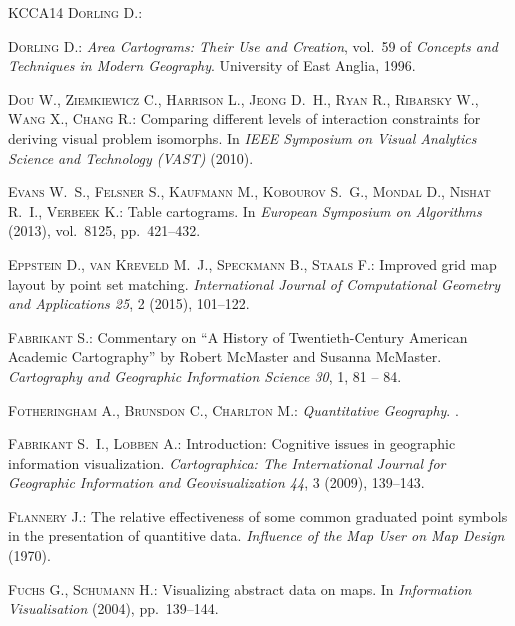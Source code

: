 \documentclass{egpubl}
\begin{document}
\begin{thebibliography}{\uppercase{KCCA{\etalchar{*}}14}}
\textsc{Dorling D.}:

\textsc{Dorling D.}:
\newblock \emph{{Area Cartograms: Their Use and Creation}}, vol.~59 of
  \emph{Concepts and Techniques in Modern Geography}.
\newblock University of East Anglia, 1996.

\textsc{Dou W., Ziemkiewicz C., Harrison L., Jeong D.~H., Ryan R., Ribarsky W.,
  Wang X., Chang R.}:
\newblock Comparing different levels of interaction constraints for deriving
  visual problem isomorphs.
\newblock In \emph{IEEE Symposium on Visual Analytics Science and Technology
  (VAST)} (2010).

\textsc{Evans W.~S., Felsner S., Kaufmann M., Kobourov S.~G., Mondal D., Nishat
  R.~I., Verbeek K.}:
\newblock Table cartograms.
\newblock In \emph{European Symposium on Algorithms} (2013), vol.~8125,
  pp.~421--432.

\textsc{Eppstein D., van Kreveld M.~J., Speckmann B., Staals F.}:
\newblock Improved grid map layout by point set matching.
\newblock \emph{International Journal of Computational Geometry and
  Applications 25}, 2 (2015), 101--122.

\textsc{Fabrikant S.}:
\newblock Commentary on ``{A History of Twentieth-Century American Academic
  Cartography}'' by {Robert McMaster and Susanna McMaster}.
\newblock \emph{Cartography and Geographic Information Science 30}, 1, 81 --
  84.

\textsc{Fotheringham A., Brunsdon C., Charlton M.}:
\newblock \emph{Quantitative Geography}.
.

\textsc{Fabrikant S.~I., Lobben A.}:
\newblock Introduction: Cognitive issues in geographic information
  visualization.
\newblock \emph{Cartographica: The International Journal for Geographic
  Information and Geovisualization 44}, 3 (2009), 139--143.

\textsc{Flannery J.}:
\newblock The relative effectiveness of some common graduated point symbols in
  the presentation of quantitive data.
\newblock \emph{Influence of the Map User on Map Design} (1970).

\textsc{Fuchs G., Schumann H.}:
\newblock Visualizing abstract data on maps.
\newblock In \emph{Information Visualisation} (2004), pp.~139--144.


\end{thebibliography}
\end{document}
